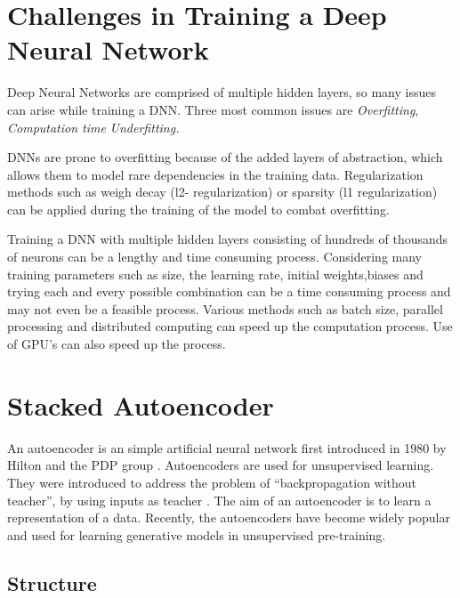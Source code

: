 \documentclass[12pt, a4paper]{report}
\begin{document}
\section{Challenges in Training a Deep Neural Network}\label{challenges}

Deep Neural Networks are comprised of multiple hidden layers, so many issues can arise while training a DNN. Three most common issues are \textit{Overfitting}, \textit{Computation time} \textit{Underfitting.}\\ \par

DNNs are prone to overfitting because of the added layers of abstraction, which allows them to model rare dependencies in the training data. Regularization methods such as weigh decay (l2- regularization) or sparsity (l1 regularization) can be applied during the training of the model to combat overfitting\cite{challenge1}.\\\par

Training a DNN with multiple hidden layers consisting of hundreds of thousands of neurons can be a lengthy and time consuming process. Considering many training parameters such as size, the learning rate, initial weights,biases and trying each and every possible combination can be a time consuming process and may not even be a feasible process\cite{challenge2}. Various methods such as batch size, parallel processing and distributed computing can speed up the computation process. Use of GPU's can also speed up the process.\\ \par

\section{Stacked Autoencoder}\label{Autoencoder}
An autoencoder is an simple artificial neural network first introduced in 1980 by Hilton and the PDP group \cite{autoencoder}. Autoencoders are used for unsupervised learning. They were introduced to address the problem of ``backpropagation without teacher'', by using inputs as teacher \cite{autoencoder2}. The aim of an autoencoder is to learn a representation of a data. Recently, the autoencoders have become widely popular and used for learning generative models in unsupervised pre-training.\\ 
\par

\subsection{Structure}\label{structure}
\end{document}
